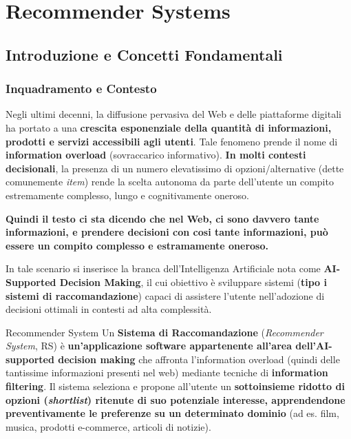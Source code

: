 \chapter{Recommender Systems}

\section{Introduzione e Concetti Fondamentali}

\subsection{Inquadramento e Contesto}
Negli ultimi decenni, la diffusione pervasiva del Web e delle piattaforme digitali ha portato a una \textbf{crescita esponenziale della quantità di informazioni, prodotti e servizi accessibili agli utenti}. Tale fenomeno prende il nome di \textbf{information overload} (sovraccarico informativo). \textbf{In molti contesti decisionali}, la presenza di un numero elevatissimo di opzioni/alternative (dette comunemente \textit{item}) rende la scelta autonoma da parte dell'utente un compito estremamente complesso, lungo e cognitivamente oneroso.



\textbf{Quindi il testo ci sta dicendo che nel Web, ci sono davvero tante informazioni, e prendere decisioni con cosi tante informazioni, può essere un compito complesso e estramamente oneroso.}



In tale scenario si inserisce la branca dell'Intelligenza Artificiale nota come \textbf{AI-Supported Decision Making}, il cui obiettivo è sviluppare sistemi (\textbf{tipo i sistemi di raccomandazione}) capaci di assistere l'utente nell'adozione di decisioni ottimali in contesti ad alta complessità.

\begin{definition}{Recommender System}
Un \textbf{Sistema di Raccomandazione} (\textit{Recommender System}, RS) è \textbf{un'applicazione software appartenente all'area dell'AI-supported decision making} che affronta l'information overload (quindi delle tantissime informazioni presenti nel web) mediante tecniche di \textbf{information filtering}. Il sistema seleziona e propone all'utente un \textbf{sottoinsieme ridotto di opzioni (\textit{shortlist}) ritenute di suo potenziale interesse, apprendendone preventivamente le preferenze su un determinato dominio} (ad es. film, musica, prodotti e-commerce, articoli di notizie).
\end{definition}

